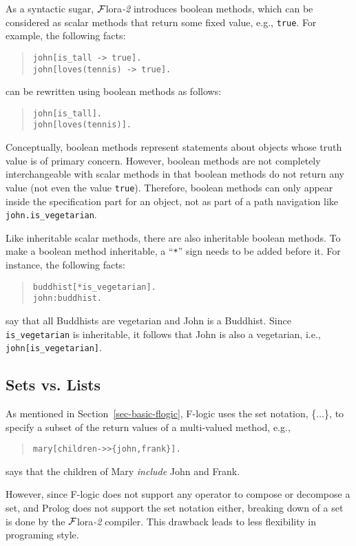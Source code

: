\documentclass[11pt]{article}
\newcommand{\FLORA}{{\mbox{${\cal F}${\sc lora}\rm\emph{-2}}}\xspace}
\newcommand{\fl}{\mbox{F-logic}\xspace}
\begin{document}
%
As a syntactic sugar, \FLORA introduces boolean methods, which can be
considered as scalar methods that return some fixed value, e.g.,
{\tt true}. For example, the following facts:
\begin{quote}
\verb|john[is_tall -> true].| \\
\verb|john[loves(tennis) -> true].|
\end{quote}
can be rewritten using boolean methods as follows:
\begin{quote}
\verb|john[is_tall].| \\
\verb|john[loves(tennis)].|
\end{quote}

Conceptually, boolean methods represent statements about objects whose
truth value is of primary concern. However, boolean methods are not
completely interchangeable with scalar methods in that boolean methods
do not return any value (not even the value {\tt true}). Therefore,
boolean methods can only appear inside the specification part for an
object, not as part of a path navigation like
\mbox{\tt john.is\_vegetarian}.

Like inheritable scalar methods, there are also inheritable boolean
methods. To make a boolean method inheritable, a ``\verb|*|'' sign
needs to be added before it. For instance, the following facts:
\begin{quote}
\begin{verbatim}
buddhist[*is_vegetarian].
john:buddhist.
\end{verbatim}
\end{quote}
say that all Buddhists are vegetarian and {\sf John} is a
Buddhist. Since \verb|is_vegetarian| is inheritable, it follows that
{\sf John} is also a vegetarian, i.e., \verb|john[is_vegetarian]|.


\subsection {Sets vs. Lists}


%
As mentioned in Section~\ref{sec-basic-flogic}, \fl uses the set
notation, \{$\ldots$\}, to specify a subset of the return values of a
multi-valued method, e.g.,
\begin{quote}
\verb|mary[children->>{john,frank}].|
\end{quote}
says that the children of {\sf Mary} \emph{include} {\sf John} and
{\sf Frank}.

However, since \fl does not support any operator to compose or
decompose a set, and Prolog does not support the set notation either,
breaking down of a set is done by the \FLORA compiler. This drawback
leads to less flexibility in programing style.
\end{document}
